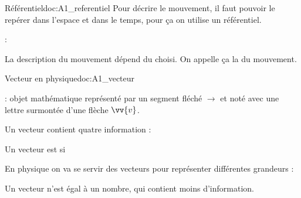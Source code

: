 \newpage
\vspace*{-34pt}
\begin{doc}{Référentiel}{doc:A1_referentiel}
  Pour décrire le mouvement, il faut pouvoir le repérer dans l’espace et dans le temps, pour ça on utilise un référentiel.
  
  \begin{importants}
     : 
  \end{importants}
  
  \begin{importants}
    La description du mouvement dépend du  choisi.
    On appelle ça la  du mouvement.
  \end{importants}
\end{doc}



\vspace*{-8pt}
\begin{doc}{Vecteur en physique}{doc:A1_vecteur}
  \begin{importants}
     : objet mathématique représenté par un segment fléché $\longrightarrow$ et noté avec une lettre surmontée d'une flèche $\vv{v}$.
    
    Un vecteur contient quatre information : 
    \begin{listePoints}[2]
      \item \! 
      \item \! 
      \item \! 
      \item \! 
    \end{listePoints}
  
    Un vecteur est  si
  \end{importants}
  
  \fleche En physique on va se servir des vecteurs pour représenter différentes grandeurs :
  
  \attention Un vecteur n'est  égal à un nombre, qui contient moins d'information.
\end{doc}

